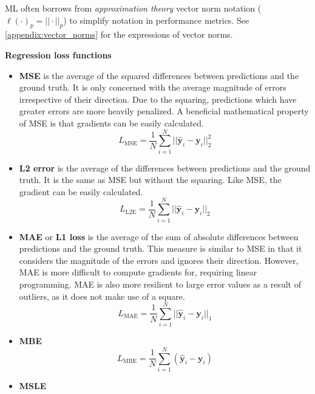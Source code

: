 \gls{ML} often borrows from \textit{approximation theory} vector norm notation
($\ell(\cdot)_p=||\cdot||_p$) to simplify notation in performance metrics. See
\autoref{appendix:vector_norms} for the expressions of vector norms.

\textbf{Regression loss functions}
\begin{itemize}
    \item \textbf{\Gls{MSE}} is the average of the squared differences between
    predictions and the ground truth. It is only concerned with the average
    magnitude of errors irrespective of their direction. Due to the squaring,
    predictions which have greater errors are more heavily penalized. A
    beneficial mathematical property of \gls{MSE} is that gradients can be
    easily calculated.
    \begin{equation}
        L_\text{MSE} = \frac{1}{N}\sum_{i=1}^{N}||\hat{\mathbf{y}}_i-\mathbf{y}_i||^2_2
    \end{equation}
    \item \textbf{L2 error} is the average of the differences between
    predictions and the ground truth. It is the same as \gls{MSE} but without
    the squaring. Like \gls{MSE}, the gradient can be easily calculated.
    \begin{equation}
        L_\text{L2E} = \frac{1}{N}\sum_{i=1}^{N}||\hat{\mathbf{y}}_i-\mathbf{y}_i||_2
    \end{equation}
    \item \textbf{\Gls{MAE}} or \textbf{L1 loss} is the average of the sum of
    absolute differences between predictions and the ground truth. This measure
    is similar to \gls{MSE} in that it considers the magnitude of the errors and
    ignores their direction. However, \gls{MAE} is more difficult to compute
    gradients for, requiring linear programming. \gls{MAE} is also more
    resilient to large error values as a result of outliers, as it does not make
    use of a square.
    \begin{equation}
        L_\text{MAE} = \frac{1}{N}\sum_{i=1}^{N}||\hat{\mathbf{y}}_i-\mathbf{y}_i||_1
    \end{equation}
    \item \textbf{\Gls{MBE}}
    \begin{equation}
        L_\text{MBE} = \frac{1}{N}\sum_{i=1}^{N}(\hat{\mathbf{y}}_i-\mathbf{y}_i)
    \end{equation}
    \item \textbf{\Gls{MSLE}}
    \begin{equation}

\end{equation}
\end{itemize}
